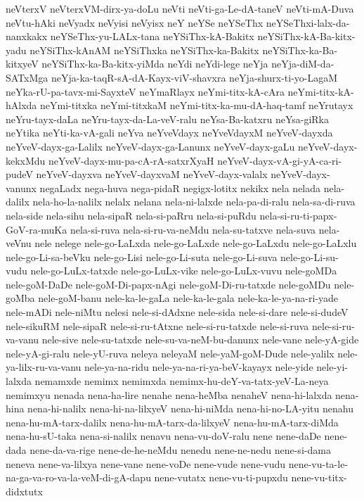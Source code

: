 {neVterxV
neVterxVM-dirx-ya-doLu
neVti
neVti-ga-Le-dA-taneV
neVti-mA-Duva
neVtu-hAki
neVyadx
neVyisi
neVyisx
neY
neYSe
neYSeThx
neYSeThxi-lalx-da-nanxkakx
neYSeThx-yu-LALx-tana
neYSiThx-kA-Bakitx
neYSiThx-kA-Ba-kitx-yadu
neYSiThx-kAnAM
neYSiThxka
neYSiThx-ka-Bakitx
neYSiThx-ka-Ba-kitxyeV
neYSiThx-ka-Ba-kitx-yiMda
neYdi
neYdi-lege
neYja
neYja-diM-da-SATxMga
neYja-ka-taqR-sA-dA-Kayx-viV-shavxra
neYja-shurx-ti-yo-LagaM
neYka-rU-pa-tavx-mi-SayxteV
neYmaRlayx
neYmi-titx-kA-cAra
neYmi-titx-kA-hAlxda
neYmi-titxka
neYmi-titxkaM
neYmi-titx-ka-mu-dA-haq-tamf
neYrutayx
neYru-tayx-daLa
neYru-tayx-da-La-veV-ralu
neYsa-Ba-katxru
neYsa-giRka
neYtika
neYti-ka-vA-gali
neYva
neYveVdayx
neYveVdayxM
neYveV-dayxda
neYveV-dayx-ga-Lalilx
neYveV-dayx-ga-Lanunx
neYveV-dayx-gaLu
neYveV-dayx-kekxMdu
neYveV-dayx-mu-pa-cA-rA-satxrXyaH
neYveV-dayx-vA-gi-yA-ca-ri-pudeV
neYveV-dayxva
neYveV-dayxvaM
neYveV-dayx-valalx
neYveV-dayx-vanunx
negaLadx
nega-huva
nega-pidaR
negigx-lotitx
nekikx
nela
nelada
nela-dalilx
nela-ho-la-nalilx
nelalx
nelana
nela-ni-lalxde
nela-pa-di-ralu
nela-sa-di-ruva
nela-side
nela-sihu
nela-sipaR
nela-si-paRru
nela-si-puRdu
nela-si-ru-ti-papx-GoV-ra-muKa
nela-si-ruva
nela-si-ru-va-neMdu
nela-su-tatxve
nela-suva
nela-veVnu
nele
nelege
nele-go-LaLxda
nele-go-LaLxde
nele-go-LaLxdu
nele-go-LaLxlu
nele-go-Li-sa-beVku
nele-go-Lisi
nele-go-Li-suta
nele-go-Li-suva
nele-go-Li-su-vudu
nele-go-LuLx-tatxde
nele-go-LuLx-vike
nele-go-LuLx-vuvu
nele-goMDa
nele-goM-DaDe
nele-goM-Di-papx-nAgi
nele-goM-Di-ru-tatxde
nele-goMDu
nele-goMba
nele-goM-banu
nele-ka-le-gaLa
nele-ka-le-gala
nele-ka-le-ya-na-ri-yade
nele-mADi
nele-niMtu
nelesi
nele-si-dAdxne
nele-sida
nele-si-dare
nele-si-dudeV
nele-sikuRM
nele-sipaR
nele-si-ru-tAtxne
nele-si-ru-tatxde
nele-si-ruva
nele-si-ru-va-vanu
nele-sive
nele-su-tatxde
nele-su-va-neM-bu-danunx
nele-vane
nele-yA-gide
nele-yA-gi-ralu
nele-yU-ruva
neleya
neleyaM
nele-yaM-goM-Dude
nele-yalilx
nele-ya-lilx-ru-va-vanu
nele-ya-na-ridu
nele-ya-na-ri-ya-beV-kayayx
nele-yide
nele-yi-lalxda
nemamxde
nemimx
nemimxda
nemimx-hu-deY-va-tatx-yeV-La-neya
nemimxyu
nenada
nena-ha-lire
nenahe
nena-heMba
nenaheV
nena-hi-lalxda
nena-hina
nena-hi-nalilx
nena-hi-na-lilxyeV
nena-hi-niMda
nena-hi-no-LA-yitu
nenahu
nena-hu-mA-tarx-dalilx
nena-hu-mA-tarx-da-lilxyeV
nena-hu-mA-tarx-diMda
nena-hu-sU-taka
nena-si-nalilx
nenavu
nena-vu-doV-ralu
nene
nene-daDe
nene-dada
nene-da-va-rige
nene-de-he-neMdu
nenedu
nene-ne-nedu
nene-si-dama
neneva
nene-va-lilxya
nene-vane
nene-voDe
nene-vude
nene-vudu
nene-vu-ta-le-na-ga-va-ro-va-la-veM-di-gA-dapu
nene-vutatx
nene-vu-ti-pupxdu
nene-vu-titx-didxtutx
}
